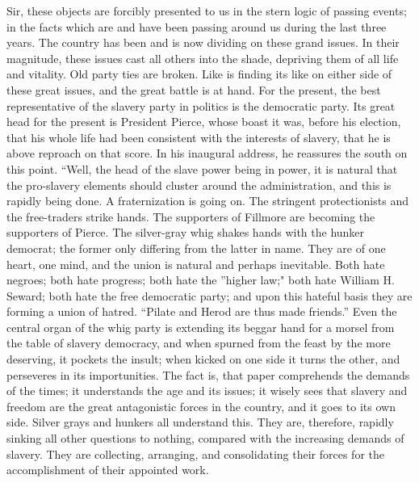 Sir, these objects are forcibly presented to us in the stern logic of
passing events; in the facts which are and have been passing around us
during the last three years. The country has been and is now dividing on
these grand issues. In their magnitude, these issues cast all others
into the shade, depriving them of all life and vitality. Old party ties
are broken. Like is finding its like on {}either side of these great
issues, and the great battle is at hand. For the present, the best
representative of the slavery party in politics is the democratic party.
Its great head for the present is President Pierce, whose boast it was,
before his election, that his whole life had been consistent with the
interests of slavery, that he is above reproach on that score. In his
inaugural address, he reassures the south on this point. ``Well, the
head of the slave power being in power, it is natural that the
pro-slavery elements should cluster around the administration, and this
is rapidly being done. A fraternization is going on. The stringent
protectionists and the free-traders strike hands. The supporters of
Fillmore are becoming the supporters of Pierce. The silver-gray whig
shakes hands with the hunker democrat; the former only differing from
the latter in name. They are of one heart, one mind, and the union is
natural and perhaps inevitable. Both hate negroes; both hate progress;
both hate the ''higher law;" both hate William H. Seward; both hate the
free democratic party; and upon this hateful basis they are forming a
union of hatred. ``Pilate and Herod are thus made friends.'' Even the
central organ of the whig party is extending its beggar hand for a
morsel from the table of slavery democracy, and when spurned from the
feast by the more deserving, it pockets the insult; when kicked on one
side it turns the other, and perseveres in its importunities. The fact
is, that paper comprehends the demands of the times; it understands the
age and its issues; it wisely sees that slavery and freedom are the
great antagonistic forces in the country, and it goes to its own side.
Silver grays and hunkers all understand this. They are, therefore,
rapidly sinking all other questions to nothing, compared with the
increasing demands of slavery. They are collecting, arranging, and
consolidating their forces for the accomplishment of their appointed
work.


